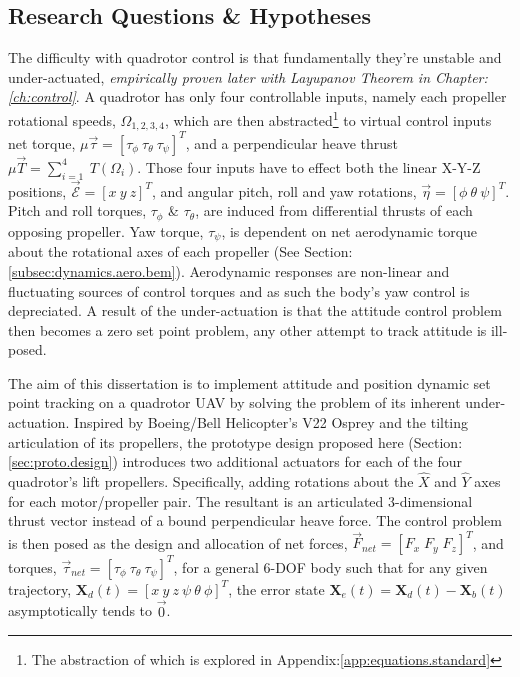 \subsection{Research Questions \& Hypotheses}
\label{subsec:intro.foreword.hypotheses}
The difficulty with quadrotor control is that fundamentally they're unstable and under-actuated, \emph{empirically proven later with Layupanov Theorem in Chapter:\ref{ch:control}}. A quadrotor has only four controllable inputs, namely each propeller rotational speeds, $\Omega_{1,2,3,4}$, which are then abstracted\footnote{The abstraction of which is explored in Appendix:\ref{app:equations.standard}} to virtual control inputs net torque, $\mu\vec{\tau}=[\tau_{\phi}~\tau_{\theta}~\tau_{\psi}]^T$, and a perpendicular heave thrust $\mu\vec{T}=\sum_{i=1}^{4}~T(\Omega_i)$. Those four inputs have to effect both the linear X-Y-Z positions, $\vec{\mathcal{E}}=[x~y~z]^T$, and angular pitch, roll and yaw rotations, $\vec{\eta}=[\phi~\theta~\psi]^T$. Pitch and roll torques, $\tau_{\phi}$ \& $\tau_{\theta}$, are induced from differential thrusts of each opposing propeller. Yaw torque, $\tau_{\psi}$, is dependent on net aerodynamic torque about the rotational axes of each propeller (See Section:\ref{subsec:dynamics.aero.bem}). Aerodynamic responses are non-linear and fluctuating sources of control torques and as such the body's yaw control is depreciated. A result of the under-actuation is that the attitude control problem then becomes a zero set point problem, any other attempt to track attitude is ill-posed.
\par
The aim of this dissertation is to implement attitude and position dynamic set point tracking on a quadrotor UAV by solving the problem of its inherent under-actuation. Inspired by Boeing/Bell Helicopter's V22 Osprey and the tilting articulation of its propellers, the prototype design proposed here (Section:\ref{sec:proto.design}) introduces two additional actuators for each of the four quadrotor's lift propellers. Specifically, adding rotations about the $\hat{X}$ and $\hat{Y}$ axes for each motor/propeller pair. The resultant is an articulated 3-dimensional thrust vector instead of a bound perpendicular heave force. The control problem is then posed as the design and allocation of net forces, $\vec{F}_{net} = [F_x\;F_y\;F_z]^T$, and torques, $\vec{\tau}_{net} = [\tau_{\phi}~\tau_{\theta}~\tau_{\psi}]^T$, for a general 6-DOF body such that for any given trajectory, $\mathbf{X}_d(t)=[x~y~z~\psi~\theta~\phi]^T$, the error state $\mathbf{X}_e(t) = \mathbf{X}_d(t) - \mathbf{X}_b(t)$ asymptotically tends to $\vec{0}$.
